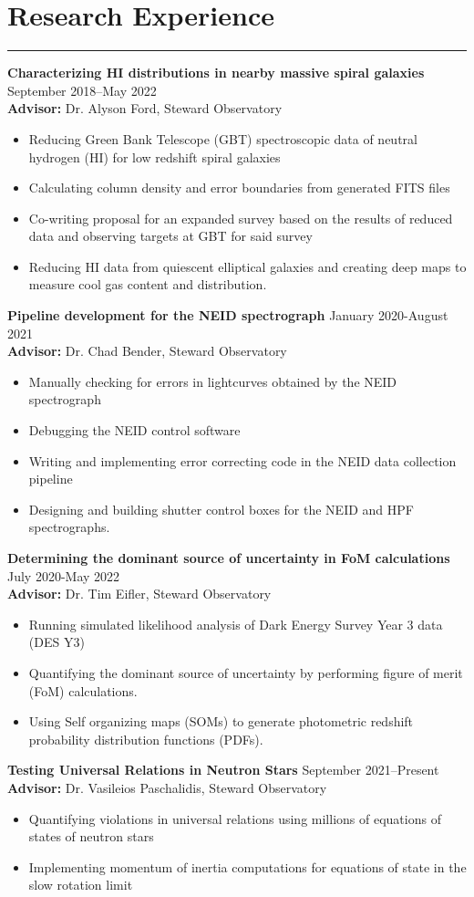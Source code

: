 \documentclass[11pt]{article}
\newcommand{\resumesection}[1]{\vspace{-0.2cm}\section*{#1}\vspace{-0.2cm}\hrule\vspace{0.2cm}}
\begin{document}
\resumesection{Research Experience}
\textbf{Characterizing HI distributions in nearby massive spiral galaxies}  \hfill September 2018--May 2022
\\\textbf{Advisor:} Dr. Alyson Ford, Steward Observatory
\begin{itemize}
	\item Reducing Green Bank Telescope (GBT) spectroscopic data of neutral hydrogen (HI) for low redshift spiral galaxies 
	\item Calculating column density and error boundaries from generated FITS files
	\item Co-writing proposal for an expanded survey based on the results of reduced data and observing targets at GBT for said survey  
	\item Reducing HI data from quiescent elliptical galaxies and creating deep maps to measure cool gas content and distribution. 
\end{itemize}
\textbf{Pipeline development for the NEID spectrograph} \hfill January 2020-August 2021
\\\textbf{Advisor:} Dr. Chad Bender, Steward Observatory
\begin{itemize}
	\item Manually checking for errors in lightcurves obtained by the NEID spectrograph
	\item Debugging the NEID control software 
	\item Writing and implementing error correcting code in the NEID data collection pipeline
	\item Designing and building shutter control boxes for the NEID and HPF spectrographs.
\end{itemize}
\textbf{Determining the dominant source of uncertainty in FoM calculations} \hfill July 2020-May 2022
\\ \textbf{Advisor:} Dr. Tim Eifler, Steward Observatory
\begin{itemize}
	\item Running simulated likelihood analysis of Dark Energy Survey Year 3 data (DES Y3)
	\item Quantifying the dominant source of uncertainty by performing figure of merit (FoM) calculations.
	\item Using Self organizing maps (SOMs) to generate photometric redshift probability distribution functions (PDFs). 
\end{itemize}
\textbf{Testing Universal Relations in Neutron Stars}  \hfill September 2021--Present
\\\textbf{Advisor:} Dr. Vasileios Paschalidis, Steward Observatory
\begin{itemize}
	\item Quantifying violations in universal relations using millions of equations of states of neutron stars 
	\item Implementing momentum of inertia computations for equations of state in the slow rotation limit
\end{itemize}
\end{document}
